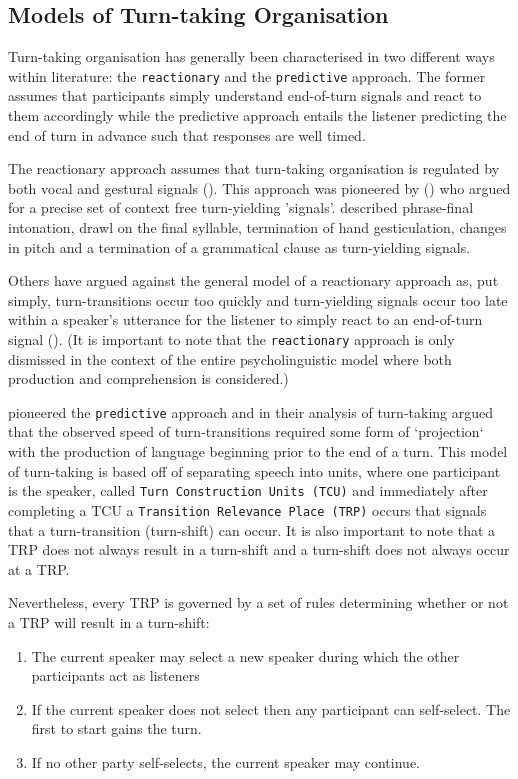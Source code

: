\documentclass[logo,bsc,singlespacing,parskip]{infthesis}
\begin{document}
\subsection{Models of Turn-taking Organisation} 
Turn-taking organisation has generally been characterised in two different ways within literature: the \texttt{reactionary} and the \texttt{predictive} approach.
The former assumes that participants simply understand end-of-turn signals and react to them accordingly while the predictive approach entails the listener predicting the end of turn in advance such that responses are well timed. 

The reactionary approach assumes that turn-taking organisation is regulated by both vocal and gestural signals (\cite{Yngve1970}). This approach was pioneered by (\cite{Duncan1972, Duncan1973, Duncan1974, Duncan1977}) who argued for a precise set of context free turn-yielding 'signals'. \cite{Duncan1972} described phrase-final intonation, drawl on the final syllable, termination of hand gesticulation, changes in pitch and a termination of a grammatical clause as turn-yielding signals. 

Others have argued against the general model of a reactionary approach as, put simply, turn-transitions occur too quickly and turn-yielding signals occur too late within a speaker's utterance for the listener to simply react to an end-of-turn signal (\cite{LevTor2015, Riest2015}). (It is important to note that the \texttt{reactionary} approach is only dismissed in the context of the entire psycholinguistic model where both production and comprehension is considered.) 

\cite{Sacks1974} pioneered the \texttt{predictive} approach and in their analysis of turn-taking argued that the observed speed of turn-transitions required some form of `projection` with the production of language beginning prior to the end of a turn. This model of turn-taking is based off of separating speech into units, where one participant is the speaker, called \texttt{Turn Construction Units (TCU)} and immediately after completing a TCU a \texttt{Transition Relevance Place (TRP)} occurs that signals that a turn-transition (turn-shift) can occur. It is also important to note that a TRP does not always result in a turn-shift and a turn-shift does not always occur at a TRP. 

\iffalse
Nevertheless, every TRP is governed by a set of rules determining whether or not a TRP will result in a turn-shift: 
\begin{enumerate}
    \item{} The current speaker may select a new speaker during which the other participants act as listeners 
    \item{} If the current speaker does not select then any participant can self-select. The first to start gains the turn.
    \item{} If no other party self-selects, the current speaker may continue. 
\end{enumerate} 
\end{document}
